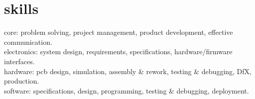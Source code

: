 
\section{skills}
  \vspace{-0.2cm}

{\headingfont core}: problem solving, project management, product development, effective communication.\\
{\headingfont electronics}: system design, requirements, specifications, hardware/firmware interfaces.\\
{\headingfont hardware}: pcb design, simulation, assembly \& rework, testing \& debugging, DfX, production. \\
{\headingfont software}: specifications, design, programming, testing \& debugging, deployment.